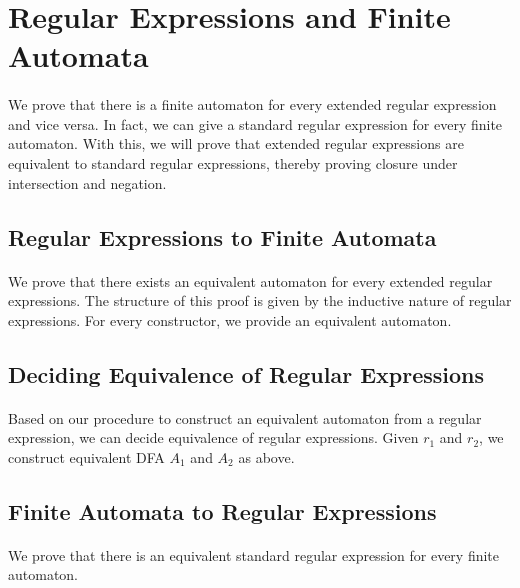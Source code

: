 \section{Regular Expressions and Finite Automata}

\paragraph{} 
We prove that there is a finite automaton for every extended regular expression and vice versa. 
In fact, we can give a standard regular expression for every finite automaton.
With this, we will prove that extended regular expressions are equivalent to standard regular expressions, 
thereby proving closure under intersection and negation.


\subsection{Regular Expressions to Finite Automata}

\paragraph{} 
We prove that there exists an equivalent automaton for every extended regular expressions.
The structure of this proof is given by the inductive nature of regular expressions.
For every constructor, we provide an equivalent automaton.


\subsection{Deciding Equivalence of Regular Expressions}

\paragraph{} 
Based on our procedure to construct an equivalent automaton from a regular expression, we can decide equivalence of regular expressions. Given $r_1$ and $r_2$, we construct equivalent DFA $A_1$ and $A_2$ as above.


\subsection{Finite Automata to Regular Expressions}
\paragraph{}
We prove that there is an equivalent standard regular expression for every finite automaton.


